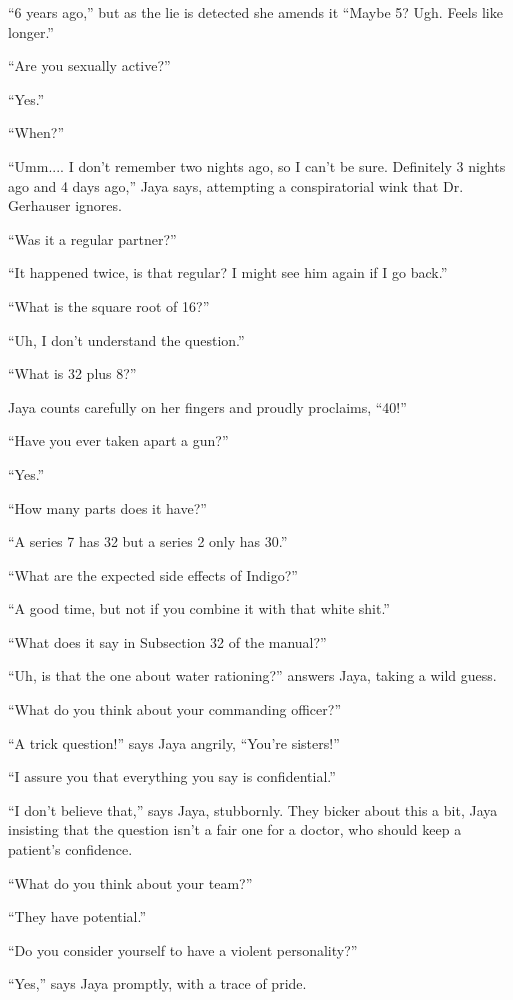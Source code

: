 ``6 years ago,'' but as the lie is detected she amends it ``Maybe 5?  Ugh.  Feels like longer.''

``Are you sexually active?''

``Yes.''

``When?''

``Umm.... I don't remember two nights ago, so I can't be sure.  Definitely 3 nights ago and 4 days ago,'' Jaya says, attempting a conspiratorial wink that Dr. Gerhauser ignores.

``Was it a regular partner?''

``It happened twice, is that regular?  I might see him again if I go back.''

``What is the square root of 16?''

``Uh, I don't understand the question.''

``What is 32 plus 8?''

Jaya counts carefully on her fingers and proudly proclaims, ``40!''

``Have you ever taken apart a gun?''

``Yes.''

``How many parts does it have?''

``A series 7 has 32 but a series 2 only has 30.''

``What are the expected side effects of Indigo?''

``A good time, but not if you combine it with that white shit.''

``What does it say in Subsection 32 of the manual?''

``Uh, is that the one about water rationing?'' answers Jaya, taking a wild guess.

``What do you think about your commanding officer?''

``A trick question!'' says Jaya angrily, ``You're sisters!''

``I assure you that everything you say is confidential.''

``I don't believe that,'' says Jaya, stubbornly.  They bicker about this a bit, Jaya insisting that the question isn't a fair one for a doctor, who should keep a patient's confidence.

``What do you think about your team?''

``They have potential.''

``Do you consider yourself to have a violent personality?''

``Yes,'' says Jaya promptly, with a trace of pride.

